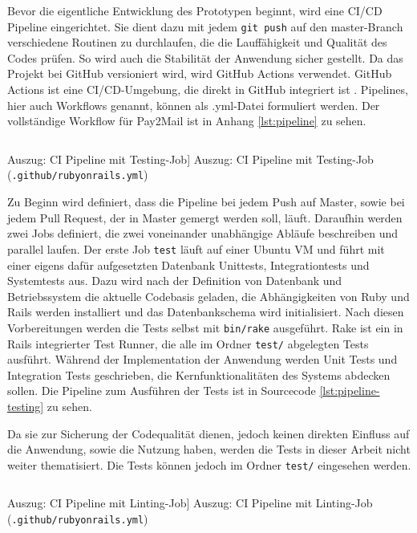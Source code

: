 Bevor die eigentliche Entwicklung des Prototypen beginnt, wird eine CI/CD Pipeline eingerichtet. Sie dient dazu mit jedem \texttt{git push} auf den master-Branch verschiedene Routinen zu durchlaufen, die die Lauffähigkeit und Qualität des Codes prüfen. So wird auch die Stabilität der Anwendung sicher gestellt. Da das Projekt bei GitHub versioniert wird, wird GitHub Actions verwendet. GitHub Actions ist eine CI/CD-Umgebung, die direkt in GitHub integriert ist \citep{GitHub2022}. Pipelines, hier auch Workflows genannt, können als .yml-Datei formuliert werden. Der vollständige Workflow für Pay2Mail ist in Anhang \ref{lst:pipeline} zu sehen.

\begin{listing}[!ht]
\inputminted[firstline=8, lastline=18, linenos]{yaml}{Listings/Prototype/rubyonrails.yml}

\caption
    [Auszug: CI Pipeline mit Testing-Job]
    {Auszug: CI Pipeline mit Testing-Job (\texttt{.github/rubyonrails.yml})}

\label{lst:pipeline-testing}
\end{listing}

Zu Beginn wird definiert, dass die Pipeline bei jedem Push auf Master, sowie bei jedem Pull Request, der in Master gemergt werden soll, läuft. Daraufhin werden zwei Jobs definiert, die zwei voneinander unabhängige Abläufe beschreiben und parallel laufen. Der erste Job \texttt{test} läuft auf einer Ubuntu VM und führt mit einer eigens dafür aufgesetzten Datenbank Unittests, Integrationtests und Systemtests aus. Dazu wird nach der Definition von Datenbank und Betriebssystem die aktuelle Codebasis geladen, die Abhängigkeiten von Ruby und Rails werden installiert und das Datenbankschema wird initialisiert. Nach diesen Vorbereitungen werden die Tests selbst mit \texttt{bin/rake} ausgeführt. Rake ist ein in Rails integrierter Test Runner, die alle im Ordner \texttt{test/} abgelegten Tests ausführt. Während der Implementation der Anwendung werden Unit Tests und Integration Tests geschrieben, die Kernfunktionalitäten des Systems abdecken sollen. Die Pipeline zum Ausführen der Tests ist in Sourcecode \ref{lst:pipeline-testing} zu sehen.

Da sie zur Sicherung der Codequalität dienen, jedoch keinen direkten Einfluss auf die Anwendung, sowie die Nutzung haben, werden die Tests in dieser Arbeit nicht weiter thematisiert. Die Tests können jedoch im Ordner \texttt{test/} eingesehen werden.

\begin{listing}[!ht]
\inputminted[firstline=19, lastline=31, linenos]{yaml}{Listings/Prototype/rubyonrails.yml}

\caption
    [Auszug: CI Pipeline mit Linting-Job]
    {Auszug: CI Pipeline mit Linting-Job (\texttt{.github/rubyonrails.yml})}
    
\label{lst:pipeline-linting}
\end{listing}


